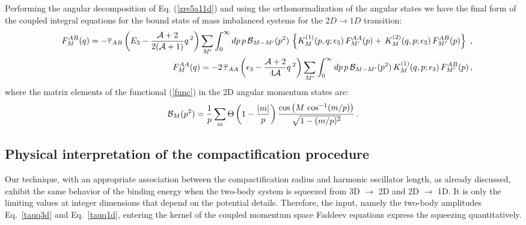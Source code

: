 \documentclass[twocolumn,showpacs,aps,prl,10pt]{revtex4}
\begin{document}
Performing the angular decomposition of Eq. (\ref{zre5a11d}) and using the orthonormalization of the 
angular states we have the final form of the coupled integral equations for the bound state 
of mass imbalanced systems for the $2D\to1D$ transition:
\begin{eqnarray}
\nonumber
&&F_M^{AB}( q) =-\overline\tau_{AB}\left(E_3-\frac{{\cal A}+2}{2({\cal A}+1)} { q}
\,^2\right)
\sum_{M'}\int_0^\infty dp \, p \, {\cal B}_{M-M'}(p^2)\, 
\left\{ K^{(1)}_{M}( p,q;\epsilon_3)
\, F^{AA}_{M'}(p)
+\, K^{(2)}_{M}( q,p;\epsilon_3)
\, F^{AB}_{M'}(p)\right\} \ ,
\\
&&F^{AA}_{M}(q) =-2\,\overline \tau_{AA}\left(\epsilon_3-\frac{{\cal A}+2}{4{\cal A}} {q}\,^2\right) 
\sum_{M'}\int_0^\infty dp \, p \, {\cal B}_{M-M'}(p^2)\, K^{(1)}_{M}( q,p;\epsilon_3)
\, F^{AB}_{M'}(p)\, ,
\end{eqnarray}
where the matrix elements of the functional (\ref{func}) in the 2D angular momentum states are:
\begin{equation}
{\cal B}_{M}(p^2)=
\frac1p\sum_m \Theta\left(1-\frac{|m|}{p} \right) 
\frac{ \cos\left(M\,\cos^{-1}(m/p) \right)}{\sqrt{1-(m/p)^2}}
 \, . \label{aa21d}
\end{equation}

\subsection{Physical interpretation of the compactification procedure}
Our technique, with an appropriate association between the compactification radius and harmonic oscillator length, as already discussed, 
exhibit the same behavior of the binding energy when the two-body system is squeezed 
from 3D $\to$ 2D and 2D $\to$ 1D. It is only the limiting values at integer dimensions that depend on the potential details. 
Therefore,
the input, namely the two-body amplitudes Eq.~\eqref{tauq3d} and Eq.~\eqref{tauq1d}, entering the kernel of the coupled momentum space Faddeev
equations express the squeezing quantitatively. 
\end{document}

